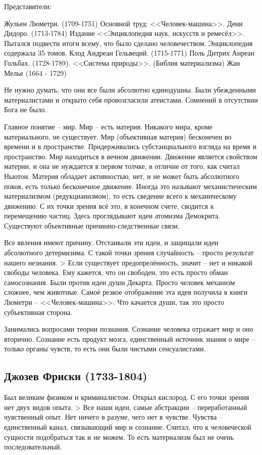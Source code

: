 Представители:

    Жульен Люметри. (1709-1751) Основной труд: <<Человек-машина>>.
    Дени Дидоро. (1713-1784) Издание <<Энциклопедия наук, искусств и ремесёл>>. Пытался подвести итоги всему, что было сделано человечеством. Энциклопедия содержала 35 томов.
    Клод Андреан Гельвеций. (1715-1771)
    Поль Дитрих Анреан Гольбах. (1728-1789). <<Система природы>>. (Библия материализма)
    Жан Мелье (1664 - 1729)

Не нужно думать, что они все были абсолютно единодушны. Были убежденными материалистами и открыто себя провозгласили атеистами. Сомнений в отсутствии Бога не было.

    Главное понятие – мир. Мир – есть материя. Никакого мира, кроме материального, не существует. Мир (объективная материя) бесконечен во времени и в пространстве. Придерживались субстанциального взгляда на время и пространство. Мир находиться в вечном движении. Движение является свойством материи, и она не нуждается в первом толчке, в отличие от того, как считал Ньютон. Материя обладает активностью, нет, и не может быть абсолютного покоя, есть только бесконечное движение. Иногда это называют механистическим материализмом (редукцианизмом), то есть сведение всего к механическому движению. С их точки зрения всё это, в конечном счете, сводится к перемещению частиц. Здесь проглядывают идеи атомизма Демокрита. Существуют объективные причинно-следственные связи.

Все явления имеют причину. Отстаивали эти идеи, и защищали идеи абсолютного детермизима. С такой точки зрения случайность – просто результат нашего незнания. > Если существует предопрелённость, значит – нет и никакой свободы человека. Ему кажется, что он свободен, это есть просто обман самосознания. Были против идеи души Декарта. Просто человек механизм сложнее, чем животные. Самоё резкое отображение эта идея получила в книги Люметри – <<Человек-машина>>. Что качается души, так это просто субъективная сторона.

Занимались вопросами теории познания. Сознание человека отражает мир и оно вторично. Сознание есть продукт мозга, единственный источник знания о мире – только органы чувств, то есть они были чистыми сенсуалистами.
\subsection{Джозев Фриски (1733-1804)}

Был великим физиком и криминалистом. Открыл кислород. С его точки зрения нет двух видов опыта. > Все наши идеи, самые абстракции – переработанный чувственный опыт. Нет ничего в разуме, чего нет в чувстве. Чувства – единственный канал, связывающий мир и сознание. Считал, что к человеческой сущности подобраться так и не можем. То есть материализм был не очень последовательный.

